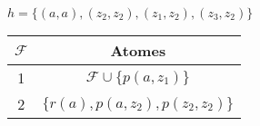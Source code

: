 \begin{example}
$h= \{(a,a),(z_2,z_2),(z_1,z_2),(z_3,z_2) \}$

\begin{center}
\begin{tabular}{|c|c|}
    \hline
    $\mathcal{F}$ & Atomes \\ 
    \hline
    1 & $\mathcal{F} \cup \{p(a, z_1)\} $\\
    \hline
    2 & $\{r(a),p(a, z_2),p(z_2, z_2)\} $\\
    \hline
\end{tabular}
\end{center}



\end{example}
\begin{comment}
\begin{tikzpicture}[->,>=stealth,shorten >=1pt,auto,node distance=4cm,
                thick,main node/.style={circle,draw,font=\Large\bfseries}]
  \node[main node] (1) {$a$};
  \node[main node] (2) [below left of=1] {$Z_0$};
  \node[main node] (3) [below right of=1] {$Z_1$};
  \node[main node] (4) [below of=2] {$Z_2$};

  \path
    (1) edge [loop above] node {r} (1)
        edge node {p} (3)
        edge node {p} (2)
    (2) edge node {p} (4)
    (3) edge [loop right] node {p} (3)
\end{tikzpicture}
\end{comment}
